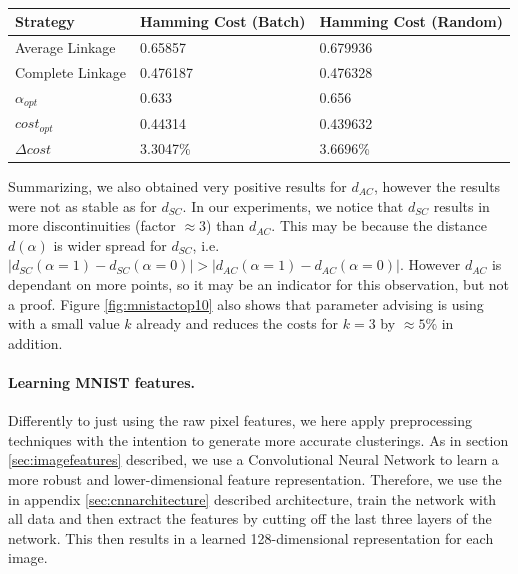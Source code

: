 \begin{table}[h]
    \centering
    \begin{tabular}{|l | l | l |}
    \hline
    Strategy & Hamming Cost (Batch) & Hamming Cost (Random)\\ \hline
    Average Linkage & 0.65857 & 0.679936\\
    Complete Linkage & 0.476187 & 0.476328\\
    $\alpha_{opt}$ & 0.633 & 0.656\\
    $cost_{opt}$ & 0.44314 & 0.439632\\
    $\Delta cost$ & 3.3047\% & 3.6696\%\\\hline
    \end{tabular}
    \caption{}
    \label{table:mnistacavg}
\end{table}

Summarizing, we also obtained very positive results for $d_{AC}$, however the results were not as stable as for $d_{SC}$. In our experiments, we notice that $d_{SC}$ results in more discontinuities (factor $\approx 3$) than $d_{AC}$. This may be because the distance $d(\alpha)$ is wider spread for $d_{SC}$, i.e. $|d_{SC}(\alpha = 1) - d_{SC}(\alpha = 0)| > |d_{AC}(\alpha = 1) - d_{AC}(\alpha = 0)|$. However $d_{AC}$ is dependant on more points, so it may be an indicator for this observation, but not a proof. Figure \ref{fig:mnistactop10} also shows that parameter advising is using with a small value $k$ already and reduces the costs for $k = 3$ by $\approx 5\%$ in addition.

\paragraph{Learning MNIST features.} Differently to just using the raw pixel features, we here apply preprocessing techniques with the intention to generate more accurate clusterings. As in section \ref{sec:imagefeatures} described, we use a Convolutional Neural Network to learn a more robust and lower-dimensional feature representation. Therefore, we use the in appendix \ref{sec:cnnarchitecture} described architecture, train the network with all data and then extract the features by cutting off the last three layers of the network. This then results in a learned 128-dimensional representation for each image.

